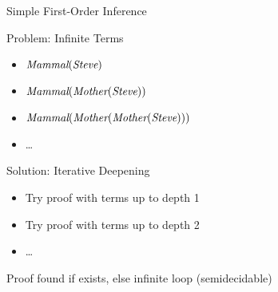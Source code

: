 \documentclass[12pt]{beamer}
\newcommand{\EM}[1]{\mbox{\em#1}}
\begin{document}
\begin{frame}{Simple First-Order Inference}
	\begin{block}{Problem: Infinite Terms}
		\begin{itemize}
			\item $\EM{Mammal}(\EM{Steve})$
			\item $\EM{Mammal}(\EM{Mother}(\EM{Steve}))$
			\item $\EM{Mammal}(\EM{Mother}(\EM{Mother}(\EM{Steve})))$
			\item \ldots
		\end{itemize}
	\end{block}
	\pause
	\begin{block}{Solution: Iterative Deepening}
		\begin{itemize}
			\item Try proof with terms up to depth 1
			\item Try proof with terms up to depth 2
			\item \ldots
		\end{itemize}
		\pause
		Proof found if exists\pause, else infinite loop \pause (\alert{semidecidable})
	\end{block}
\end{frame}
\end{document}
